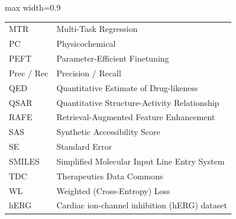 \documentclass[pdflatex,sn-mathphys-num]{sn-jnl}%
\begin{document}
\begin{table}[!ht]
\begin{adjustbox}{max width=0.9\textwidth}
\begin{tabular}{ll}
MTR & Multi-Task Regression \\
PC & Physicochemical \\
PEFT & Parameter-Efficient Finetuning \\
Prec / Rec & Precision / Recall \\
QED & Quantitative Estimate of Drug-likeness \\
QSAR & Quantitative Structure-Activity Relationship \\
RAFE & Retrieval-Augmented Feature Enhancement \\
SAS & Synthetic Accessibility Score \\
SE & Standard Error \\
SMILES & Simplified Molecular Input Line Entry System \\
TDC & Therapeutics Data Commons \\
WL & Weighted (Cross-Entropy) Loss \\
hERG & Cardiac ion-channel inhibition (hERG) dataset \\
\bottomrule
\end{tabular}
\end{adjustbox}
\end{table}


\footnotesize{

}
\end{document}
